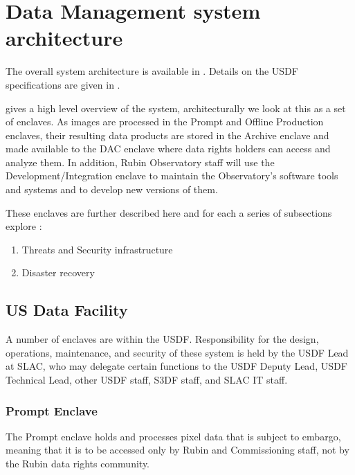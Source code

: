 

\section{Data Management system architecture} \label{sec:dparc}
The overall system architecture is available in .
Details on the \gls{USDF} specifications are given in .

 gives a high level overview of the system, architecturally we look
at this as a set of enclaves.
As images are processed in the Prompt and Offline Production enclaves, their resulting data products are stored in the \gls{Archive} enclave and made available to the \gls{DAC} enclave where data rights holders can access and analyze them.
In addition, Rubin Observatory staff will use the Development/Integration enclave to maintain the Observatory's \gls{software} tools and systems and to develop new versions of them.

These enclaves are further described here and for each a series of subsections explore :


\begin{enumerate}
\item Threats and Security infrastructure
\item Disaster recovery
\end{enumerate}

\subsection{US Data Facility}\label{sec:usdf}

A number of enclaves are within the \gls{USDF}.
Responsibility for the design, operations, maintenance, and security of these system is held by the \gls{USDF} Lead at SLAC, who may delegate certain functions to the \gls{USDF} Deputy Lead, \gls{USDF} Technical Lead, other \gls{USDF} staff, S3DF staff, and SLAC IT staff.

\subsubsection{Prompt \gls{Enclave}} \label{sec:promptenc}

The Prompt enclave holds and processes pixel data that is subject to embargo, meaning that it is to be accessed only by Rubin and \gls{Commissioning} staff, not by the Rubin data rights community.

